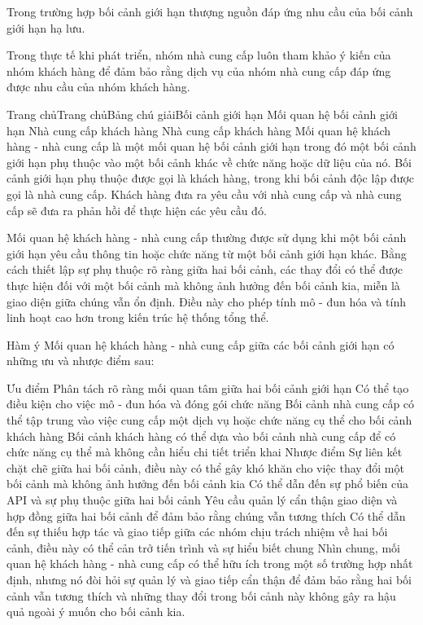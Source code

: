 
Trong trường hợp bối cảnh giới hạn thượng nguồn đáp ứng nhu cầu của bối cảnh giới hạn hạ lưu.

Trong thực tế khi phát triển, nhóm nhà cung cấp luôn tham khảo ý kiến của nhóm khách hàng để đảm bảo rằng dịch vụ của nhóm nhà cung cấp đáp ứng được nhu cầu của nhóm khách hàng.


Trang chủTrang chủBảng chú giảiBối cảnh giới hạn Mối quan hệ bối cảnh giới hạn Nhà cung cấp khách hàng
Nhà cung cấp khách hàng
Mối quan hệ khách hàng - nhà cung cấp là một mối quan hệ bối cảnh giới hạn trong đó một bối cảnh giới hạn phụ thuộc vào một bối cảnh khác về chức năng hoặc dữ liệu của nó. Bối cảnh giới hạn phụ thuộc được gọi là khách hàng, trong khi bối cảnh độc lập được gọi là nhà cung cấp. Khách hàng đưa ra yêu cầu với nhà cung cấp và nhà cung cấp sẽ đưa ra phản hồi để thực hiện các yêu cầu đó.

Mối quan hệ khách hàng - nhà cung cấp thường được sử dụng khi một bối cảnh giới hạn yêu cầu thông tin hoặc chức năng từ một bối cảnh giới hạn khác. Bằng cách thiết lập sự phụ thuộc rõ ràng giữa hai bối cảnh, các thay đổi có thể được thực hiện đối với một bối cảnh mà không ảnh hưởng đến bối cảnh kia, miễn là giao diện giữa chúng vẫn ổn định. Điều này cho phép tính mô - đun hóa và tính linh hoạt cao hơn trong kiến trúc hệ thống tổng thể.

Hàm ý
Mối quan hệ khách hàng - nhà cung cấp giữa các bối cảnh giới hạn có những ưu và nhược điểm sau:

Ưu điểm
Phân tách rõ ràng mối quan tâm giữa hai bối cảnh giới hạn
Có thể tạo điều kiện cho việc mô - đun hóa và đóng gói chức năng
Bối cảnh nhà cung cấp có thể tập trung vào việc cung cấp một dịch vụ hoặc chức năng cụ thể cho bối cảnh khách hàng
Bối cảnh khách hàng có thể dựa vào bối cảnh nhà cung cấp để có chức năng cụ thể mà không cần hiểu chi tiết triển khai
Nhược điểm
Sự liên kết chặt chẽ giữa hai bối cảnh, điều này có thể gây khó khăn cho việc thay đổi một bối cảnh mà không ảnh hưởng đến bối cảnh kia
Có thể dẫn đến sự phổ biến của API và sự phụ thuộc giữa hai bối cảnh
Yêu cầu quản lý cẩn thận giao diện và hợp đồng giữa hai bối cảnh để đảm bảo rằng chúng vẫn tương thích
Có thể dẫn đến sự thiếu hợp tác và giao tiếp giữa các nhóm chịu trách nhiệm về hai bối cảnh, điều này có thể cản trở tiến trình và sự hiểu biết chung
Nhìn chung, mối quan hệ khách hàng - nhà cung cấp có thể hữu ích trong một số trường hợp nhất định, nhưng nó đòi hỏi sự quản lý và giao tiếp cẩn thận để đảm bảo rằng hai bối cảnh vẫn tương thích và những thay đổi trong bối cảnh này không gây ra hậu quả ngoài ý muốn cho bối cảnh kia.


